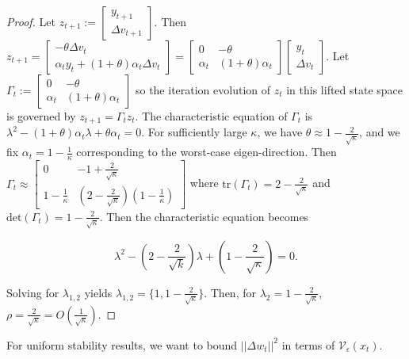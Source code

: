 \documentclass[twoside,11pt]{article}
\begin{document}
\begin{proof}
\noindent
Let $z_{t+1} := \begin{bmatrix}
    y_{t+1} \\
    \Delta v_{t+1}
\end{bmatrix}$. Then $z_{t+1} = \begin{bmatrix}
    -\theta \Delta v_t \\
    \alpha_t y_t + (1+\theta)\alpha_t \Delta v_t
\end{bmatrix} = \begin{bmatrix}
    0 & -\theta \\
    \alpha_t & (1+\theta)\alpha_t
\end{bmatrix}\begin{bmatrix}
    y_t \\
    \Delta v_t
\end{bmatrix}$. Let $\Gamma_t := \begin{bmatrix}
    0 & -\theta \\
    \alpha_t & (1+\theta)\alpha_t
\end{bmatrix}$ so the iteration evolution of $z_t$ in this lifted state space is governed by $z_{t+1} = \Gamma_t z_t$. The characteristic equation of $\Gamma_t$ is $\lambda^2-(1+\theta)\alpha_t \lambda + \theta \alpha_t = 0$. For sufficiently large $\kappa$, we have $\theta \approx 1 - \frac{2}{\sqrt{\kappa}}$, and we fix $\alpha_t = 1 - \frac{1}{\kappa}$ corresponding to the worst-case eigen-direction. Then $\Gamma_t \approx \begin{bmatrix}
    0 & -1 + \frac{2}{\sqrt{\kappa}} \\
    1-\frac{1}{\kappa} & (2-\frac{2}{\sqrt{\kappa}})(1-\frac{1}{\kappa})
\end{bmatrix}$ where $\text{tr}(\Gamma_t) = 2 - \frac{2}{\sqrt{\kappa}}$ and $\text{det}(\Gamma_t) = 1-\frac{2}{\sqrt{\kappa}}$. Then the characteristic equation becomes

\begin{equation}
\lambda^2 - (2-\frac{2}{\sqrt{k}})\lambda + (1-\frac{2}{\sqrt{\kappa}})=0.
\end{equation}

\noindent
Solving for $\lambda_{1,2}$ yields $\lambda_{1,2} = \{1, 1- \frac{2}{\sqrt{\kappa}}\}$. Then, for $\lambda_2 = 1 - \frac{2}{\sqrt{\kappa}}$, $\rho = \frac{2}{\sqrt{\kappa}} = O(\frac{1}{\sqrt{\kappa}})$.
\end{proof}

\noindent
For uniform stability results, we want to bound $||\Delta w_t||^2$ in terms of $\mathcal{V}_{\epsilon}(x_t)$.
\end{document}
